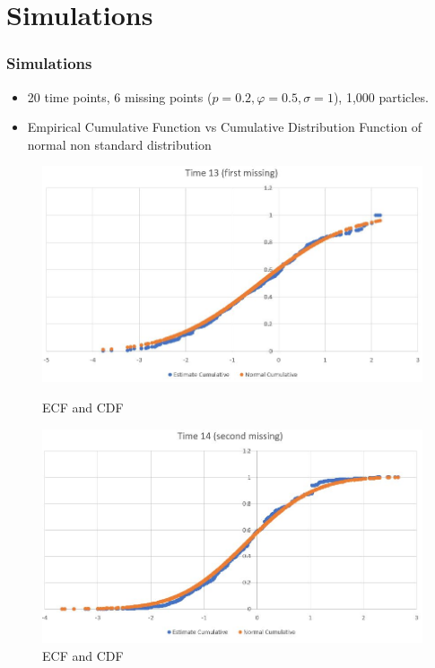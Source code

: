 \documentclass[9pt]{beamer}
\begin{document}
\section{Simulations}
\begin{frame}
\frametitle{Simulations}
\begin{itemize}
\item 20 time points, 6 missing points ($p = 0.2, \varphi = 0.5, \sigma = 1$), 1,000 particles.
\item Empirical Cumulative Function vs Cumulative Distribution Function of normal non standard distribution
\end{itemize}
\begin{figure}
\begin{minipage}{0.4\textwidth}
\centering
\includegraphics[scale=0.2]{im1.JPG}
\caption{ECF and CDF}
\end{minipage}
\begin{minipage}{0.4\textwidth}
\centering
\includegraphics[scale=0.2]{im2.JPG}
\caption{ECF and CDF}
\end{minipage}%
\begin{minipage}{0.4\textwidth}

\end{minipage}
\end{figure}
\end{frame}
\end{document}

